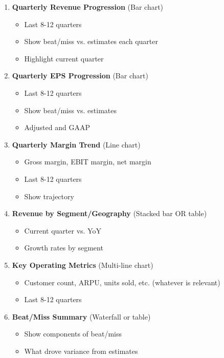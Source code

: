 \documentclass[11pt]{article}
\begin{document}
\begin{enumerate}[leftmargin=*,itemsep=2pt,topsep=2pt]
\item {} \textbf{Quarterly Revenue Progression} (Bar chart)
\begin{itemize}[leftmargin=*,itemsep=2pt,topsep=2pt]
\item {} Last 8-12 quarters
\item {} Show beat/miss vs. estimates each quarter
\item {} Highlight current quarter
\end{itemize}
\item {} \textbf{Quarterly EPS Progression} (Bar chart)
\begin{itemize}[leftmargin=*,itemsep=2pt,topsep=2pt]
\item {} Last 8-12 quarters
\item {} Show beat/miss vs. estimates
\item {} Adjusted and GAAP
\end{itemize}
\item {} \textbf{Quarterly Margin Trend} (Line chart)
\begin{itemize}[leftmargin=*,itemsep=2pt,topsep=2pt]
\item {} Gross margin, EBIT margin, net margin
\item {} Last 8-12 quarters
\item {} Show trajectory
\end{itemize}
\item {} \textbf{Revenue by Segment/Geography} (Stacked bar OR table)
\begin{itemize}[leftmargin=*,itemsep=2pt,topsep=2pt]
\item {} Current quarter vs. YoY
\item {} Growth rates by segment
\end{itemize}
\item {} \textbf{Key Operating Metrics} (Multi-line chart)
\begin{itemize}[leftmargin=*,itemsep=2pt,topsep=2pt]
\item {} Customer count, ARPU, units sold, etc. (whatever is relevant)
\item {} Last 8-12 quarters
\end{itemize}
\item {} \textbf{Beat/Miss Summary} (Waterfall or table)
\begin{itemize}[leftmargin=*,itemsep=2pt,topsep=2pt]
\item {} Show components of beat/miss
\item {} What drove variance from estimates

\end{itemize}
\end{enumerate}
\end{document}
